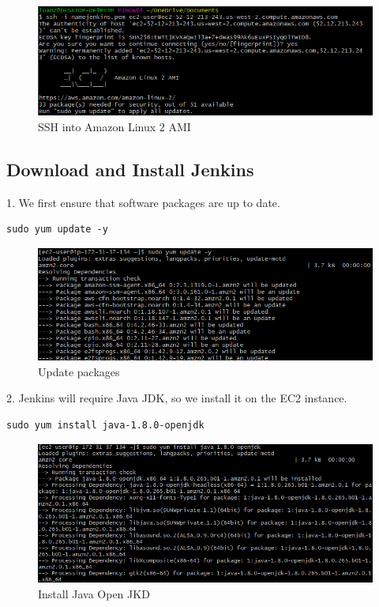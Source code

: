 \documentclass[12pt,a4paper,twoside]{article}
\begin{document}
\begin{figure}[H]
    \centering
        \includegraphics[width=15cm]{images-aws/13-ssh-connect.png}
        \caption{SSH into Amazon Linux 2 AMI}
\end{figure}


\subsection{Download and Install Jenkins}


1. We first ensure that software packages are up to date.


\begin{verbatim}
sudo yum update -y
\end{verbatim}


\begin{figure}[H]
    \centering
        \includegraphics[width=15cm]{images-aws/14-yum-update.png}
        \caption{Update packages}
\end{figure}


2. Jenkins will require Java JDK, so we install it on the EC2 instance.


\begin{verbatim}
sudo yum install java-1.8.0-openjdk
\end{verbatim}


\begin{figure}[H]
    \centering
        \includegraphics[width=15cm]{images-aws/15-install-java.png}
        \caption{Install Java Open JKD}
\end{figure}
\end{document}
